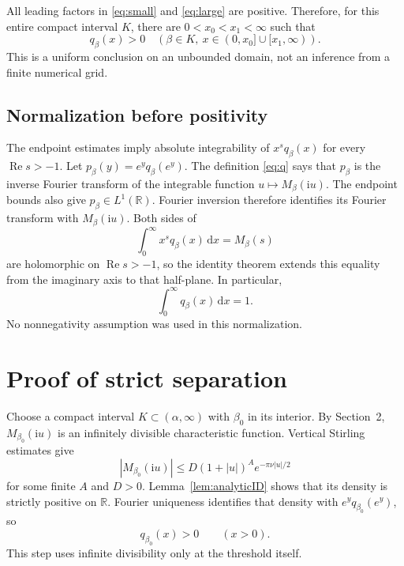 \documentclass[11pt,a4paper]{article}
\numberwithin{equation}{section}
\theoremstyle{definition}\newtheorem{definition}[theorem]{Definition}
\theoremstyle{remark}\newtheorem{remark}[theorem]{Remark}
\newcommand{\R}{\mathbb R}
\newcommand{\ii}{\mathrm i}
\newcommand{\dd}{\,\mathrm d}
\DeclareMathOperator{\Rea}{Re}
\begin{document}
All leading factors in \eqref{eq:small} and \eqref{eq:large} are
positive. Therefore, for this entire compact interval \(K\), there
are \(0<x_0<x_1<\infty\) such that
\begin{equation}\label{eq:endpositive}
 q_\beta(x)>0\quad
 (\beta\in K,\ x\in(0,x_0]\cup[x_1,\infty)).
\end{equation}
This is a uniform conclusion on an unbounded domain, not an inference
from a finite numerical grid.

\subsection{Normalization before positivity}

The endpoint estimates imply absolute integrability of
\(x^s q_\beta(x)\) for every \(\Rea s>-1\). Let
\(p_\beta(y)=e^y q_\beta(e^y)\). The definition
\eqref{eq:q} says that \(p_\beta\) is the inverse Fourier
transform of the integrable function \(u\mapsto M_\beta(\ii u)\).
The endpoint bounds also give \(p_\beta\in L^1(\R)\). Fourier
inversion therefore identifies its Fourier transform with
\(M_\beta(\ii u)\). Both sides of
\begin{equation}\label{eq:mellin}
 \int_0^\infty x^s q_\beta(x)\dd x=M_\beta(s)
\end{equation}
are holomorphic on \(\Rea s>-1\), so the identity theorem extends
this equality from the imaginary axis to that half-plane. In particular,
\begin{equation}\label{eq:mass}
 \int_0^\infty q_\beta(x)\dd x=1.
\end{equation}
No nonnegativity assumption was used in this normalization.

\section{Proof of strict separation}

Choose a compact interval \(K\subset(\alpha,\infty)\) with
\(\beta_0\) in its interior. By Section~2,
\(M_{\beta_0}(\ii u)\) is an infinitely divisible characteristic
function. Vertical Stirling estimates give
\[
 |M_{\beta_0}(\ii u)|
 \le D(1+|u|)^A e^{-\pi\nu|u|/2}
\]
for some finite \(A\) and \(D>0\). Lemma~\ref{lem:analyticID}
shows that its density is strictly positive on \(\R\). Fourier
uniqueness identifies that density with
\(e^y q_{\beta_0}(e^y)\), so
\begin{equation}\label{eq:strict}
 q_{\beta_0}(x)>0\qquad(x>0).
\end{equation}
This step uses infinite divisibility only at the threshold itself.
\end{document}
